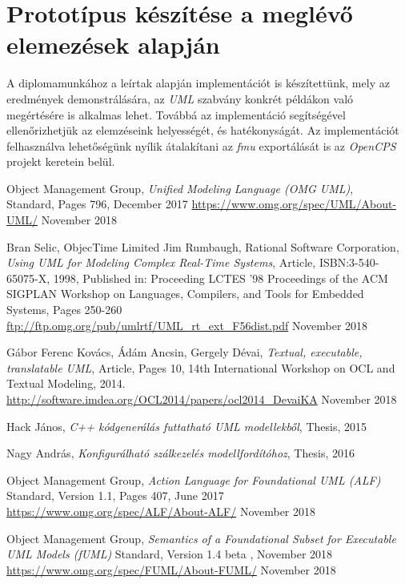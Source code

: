 \documentclass[a4paper,12pt]{report}
\begin{document}
\section{Prototípus készítése a meglévő elemezések alapján}
A diplomamunkához a leírtak alapján implementációt is készítettünk, mely az eredmények demonstrálására, az \textit{UML} szabvány konkrét példákon való megértésére is alkalmas lehet. Továbbá az implementáció segítségével ellenőrizhetjük az elemzéseink helyességét, és hatékonyságát. Az implementációt felhasználva lehetőségünk nyílik átalakítani az \textit{fmu} exportálását is az \textit{OpenCPS} projekt keretein belül.

\begin{thebibliography}{4}


	Object Management Group, 
	\emph{Unified Modeling Language (OMG UML)}, \\
	Standard, Pages 796, December 2017
	\url{https://www.omg.org/spec/UML/About-UML/} November 2018

	Bran Selic, ObjecTime Limited 
	Jim Rumbaugh, Rational Software Corporation,
	\emph{Using UML for Modeling Complex Real-Time Systems}, Article,
	ISBN:3-540-65075-X, 1998, Published in: Proceeding
LCTES '98 Proceedings of the ACM SIGPLAN Workshop on Languages, Compilers, and Tools for Embedded Systems, Pages 250-260  \\
	\url{ftp://ftp.omg.org/pub/umlrtf/UML_rt_ext_F56dist.pdf} November 2018
	
  Gábor Ferenc Kovács, Ádám Ancsin, Gergely Dévai,
  \emph{Textual, executable, translatable UML}, Article, Pages 10,
  14th International Workshop on OCL and Textual Modeling, 2014. 
  \url{http://software.imdea.org/OCL2014/papers/ocl2014_DevaiKA} November 2018
  
  
	Hack János, 
	\emph{C++ kódgenerálás futtatható UML modellekből}, Thesis, 2015
	
	Nagy András, 
	\emph{Konfigurálható szálkezelés modellfordítóhoz}, Thesis, 2016


	Object Management Group,
	\emph{Action Language for Foundational UML (ALF)}
	Standard, Version 1.1, Pages 407, June 2017\\
	\url{https://www.omg.org/spec/ALF/About-ALF/} November 2018
	
	Object Management Group,  \emph{Semantics of a Foundational Subset for Executable UML Models (fUML)} 
	Standard, Version 1.4 beta , November 2018\\
	\url{https://www.omg.org/spec/FUML/About-FUML/} November 2018


\end{thebibliography}
\end{document}
